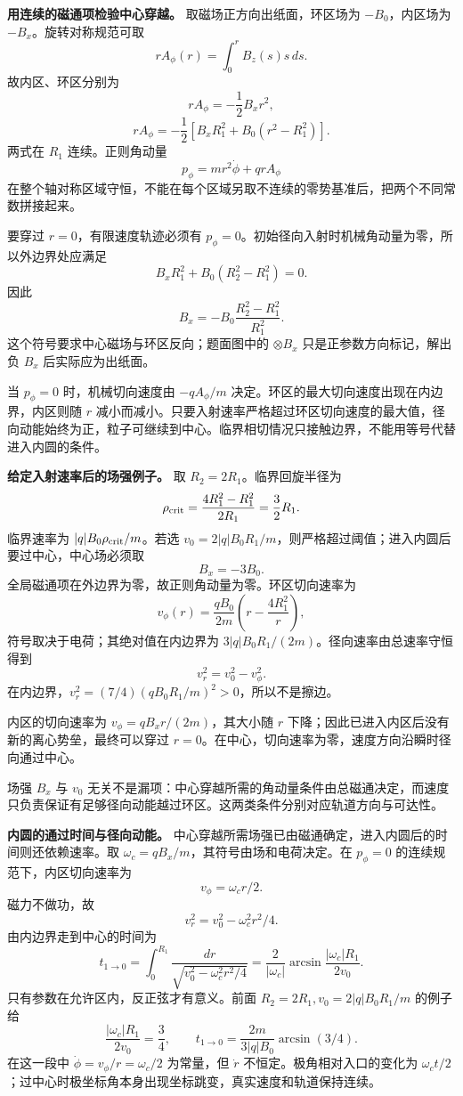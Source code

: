\documentclass[12pt,a4paper,UTF8]{ctexart}
\begin{document}
\textbf{用连续的磁通项检验中心穿越。} 取磁场正方向出纸面，环区场为
\(-B_0\)，内区场为 \(-B_x\)。旋转对称规范可取 \[
rA_\phi(r)=\int_0^r B_z(s)s\,ds.
\] 故内区、环区分别为 \[
rA_\phi=-\frac12B_xr^2,
\] \[
rA_\phi=-\frac12[B_xR_1^2+B_0(r^2-R_1^2)].
\] 两式在 \(R_1\) 连续。正则角动量 \[
p_\phi=mr^2\dot\phi+qrA_\phi
\]
在整个轴对称区域守恒，不能在每个区域另取不连续的零势基准后，把两个不同常数拼接起来。

要穿过 \(r=0\)，有限速度轨迹必须有
\(p_\phi=0\)。初始径向入射时机械角动量为零，所以外边界处应满足 \[
B_xR_1^2+B_0(R_2^2-R_1^2)=0.
\] 因此 \[
B_x=-B_0\frac{R_2^2-R_1^2}{R_1^2}.
\] 这个符号要求中心磁场与环区反向；题面图中的 \(\otimes B_x\)
只是正参数方向标记，解出负 \(B_x\) 后实际应为出纸面。

当 \(p_\phi=0\) 时，机械切向速度由 \(-qA_\phi/m\)
决定。环区的最大切向速度出现在内边界，内区则随 \(r\)
减小而减小。只要入射速率严格超过环区切向速度的最大值，径向动能始终为正，粒子可继续到中心。临界相切情况只接触边界，不能用等号代替进入内圆的条件。

\textbf{给定入射速率后的场强例子。} 取 \(R_2=2R_1\)。临界回旋半径为 \[
\rho_{\rm crit}=\frac{4R_1^2-R_1^2}{2R_1}=\frac32R_1.
\] 临界速率为 \(|q|B_0\rho_{\rm crit}/m\)。若选
\(v_0=2|q|B_0R_1/m\)，则严格超过阈值；进入内圆后要过中心，中心场必须取
\[
B_x=-3B_0.
\] 全局磁通项在外边界为零，故正则角动量为零。环区切向速率为 \[
v_\phi(r)=\frac{qB_0}{2m}\left(r-\frac{4R_1^2}{r}\right),
\] 符号取决于电荷；其绝对值在内边界为
\(3|q|B_0R_1/(2m)\)。径向速率由总速率守恒得到 \[
v_r^2=v_0^2-v_\phi^2.
\] 在内边界，\(v_r^2=(7/4)(qB_0R_1/m)^2>0\)，所以不是擦边。

内区的切向速率为 \(v_\phi=qB_xr/(2m)\)，其大小随 \(r\)
下降；因此已进入内区后没有新的离心势垒，最终可以穿过
\(r=0\)。在中心，切向速率为零，速度方向沿瞬时径向通过中心。

场强 \(B_x\) 与 \(v_0\)
无关不是漏项：中心穿越所需的角动量条件由总磁通决定，而速度只负责保证有足够径向动能越过环区。这两类条件分别对应轨道方向与可达性。

\textbf{内圆的通过时间与径向动能。}
中心穿越所需场强已由磁通确定，进入内圆后的时间则还依赖速率。取
\(\omega_c=qB_x/m\)，其符号由场和电荷决定。在 \(p_\phi=0\)
的连续规范下，内区切向速率为 \[
v_\phi=\omega_c r/2.
\] 磁力不做功，故 \[
v_r^2=v_0^2-\omega_c^2r^2/4.
\] 由内边界走到中心的时间为 \[
t_{1\to0}=\int_0^{R_1}\frac{dr}{\sqrt{v_0^2-\omega_c^2r^2/4}}
=\frac2{|\omega_c|}\arcsin\frac{|\omega_c|R_1}{2v_0}.
\] 只有参数在允许区内，反正弦才有意义。前面
\(R_2=2R_1,v_0=2|q|B_0R_1/m\) 的例子给 \[
\frac{|\omega_c|R_1}{2v_0}=\frac34,
\qquad t_{1\to0}=\frac{2m}{3|q|B_0}\arcsin(3/4).
\] 在这一段中 \(\dot\phi=v_\phi/r=\omega_c/2\) 为常量，但 \(\dot r\)
不恒定。极角相对入口的变化为
\(\omega_ct/2\)；过中心时极坐标角本身出现坐标跳变，真实速度和轨道保持连续。
\end{document}
